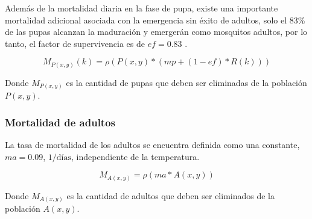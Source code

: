 Además de la mortalidad diaria en la fase de pupa, existe una importante mortalidad adicional
asociada con la emergencia sin éxito de adultos, solo el 83\%  de las pupas alcanzan la maduración
y emergerán como mosquitos adultos, por lo tanto, el factor de supervivencia es de $ef=0.83$
\citep{otero2006stochastic}.

\begin{equation}
    M_{P(x,y)}(k) = \rho(P(x,y) * (mp + (1 - ef) * R(k)))
\end{equation}

Donde $M_{P(x,y)}$ es la cantidad de pupas que deben ser eliminadas de la población $P(x,y)$.

\subsubsection{Mortalidad de adultos}
La tasa de mortalidad de los adultos se encuentra definida como una constante, $ma = 0.09$,
$1/\text{días}$, independiente de la temperatura\citep{otero2006stochastic}.

\begin{equation}
    M_{A(x,y)} = \rho(ma * A(x,y))
\end{equation}

Donde $M_{A(x,y)}$ es la cantidad de adultos que deben ser eliminados de la población $A(x,y)$.
